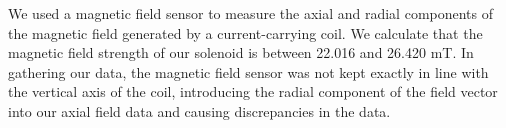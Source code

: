 We used a magnetic field sensor to measure the axial and radial components of the magnetic field generated by a current-carrying coil. We calculate that the magnetic field strength of our solenoid is between 22.016 and 26.420 mT. In gathering our data, the magnetic field sensor was not kept exactly in line with the vertical axis of the coil, introducing the radial component of the field vector into our axial field data and causing discrepancies in the data.